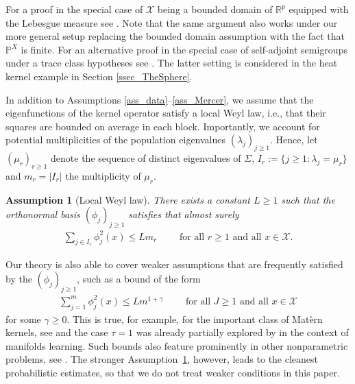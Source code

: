 \documentclass[a4paper,11pt]{article} %
\numberwithin{equation}{section}
\theoremstyle{definition}
\theoremstyle{remark}
\theoremstyle{plain}
\newtheorem{assumption}{Assumption}
\begin{document}
\noindent For a proof in the special case of $\mathcal{X}$ being a bounded domain of $\mathbb{R}^p$ equipped with the Lebesgue measure see \cite[Theorem 4.23]{B20}. Note that the same argument also works under our more general setup replacing the bounded domain assumption with the fact that \( \mathbb{P}^{X} \) is finite. For an alternative proof in the special case of self-adjoint semigroups under a trace class hypotheses see \cite[Theorem 7.2.5]{D07}. The latter setting is considered in the heat kernel example in Section \ref{ssec_TheSphere}.

In addition to Assumptions \ref{ass_data}--\ref{ass_Mercer}, we assume that the eigenfunctions of the kernel operator satisfy a local Weyl law, i.e., that their squares are bounded on average in each block. Importantly, we account for potential multiplicities of the population eigenvalues \( (\lambda_{j})_{ j \ge 1} \).
Hence, let \( (\mu_{r})_{r \ge 1} \) denote the sequence of distinct eigenvalues of \( \Sigma \), \( I_{r} := \{ j \ge 1: \lambda_{j} = \mu_{r} \} \) and \( m_{r} = | I_{r} | \) the multiplicity of \( \mu_{r} \).  

\begin{assumption}[Local Weyl law]
  \label{ass_LocalWeylLaw} 
  There exists a constant \( L \ge 1 \) such that the  orthonormal basis \( ( \phi_{j} )_{j \ge 1} \) satisfies that almost surely
  \begin{align}
    \sum_{j\in I_r}\phi_j^2(x)\leq L m_r
    \qquad \text{ for all } r \geq 1\text{ and all } x\in\mathcal{X}.
  \end{align}
\end{assumption}

\noindent Our theory is also able to cover weaker assumptions that are frequently satisfied by the \( (\phi_{j})_{j \ge 1} \), such as a bound of the form
\begin{align}
      \sum_{j =1}^{m} \phi_{j}^{2}(x) \le L m^{1+\gamma}\qquad \text{ for all } J \geq 1\text{ and all } x\in\mathcal{X}
\end{align}
for some \( \gamma \geq 0 \).
This is true, for example, for the important class of Matèrn kernels, see \cite{Rosa2025L2ContractionRates} and the case \( \tau = 1 \) was already partially explored by \cite{Wahl2024LaplacianEigenmaps} in the context of manifolds learning. 
Such bounds also feature prominently in other nonparametric problems, see \cite{Massart2007ModelSelection, BarronEtal1999ModelSelection}. 
The stronger Assumption~\ref{ass_LocalWeylLaw}, however, leads to the cleanest probabilistic estimates, so that we do not treat weaker conditions in this paper.
\end{document}
